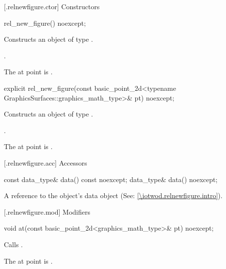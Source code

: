  [\iotwod.relnewfigure.ctor] {Constructors}%

%
\begin{itemdecl}
rel_new_figure() noexcept;
\end{itemdecl}
\begin{itemdescr}
\pnum
\effects Constructs an object of type .

\pnum
\postconditions {}.

\pnum
\remarks The at point is .
\end{itemdescr}

%
\begin{itemdecl}
explicit rel_new_figure(const basic_point_2d<typename
  GraphicsSurfaces::graphics_math_type>& pt) noexcept;
\end{itemdecl}
\begin{itemdescr}
\pnum
\effects Constructs an object of type .

\pnum
\postconditions {}.

\pnum
\remarks The at point is .
\end{itemdescr}

 [\iotwod.relnewfigure.acc] {Accessors}%

%
\begin{itemdecl}
const data_type& data() const noexcept;
data_type& data() noexcept;
\end{itemdecl}
\begin{itemdescr}
\pnum
\returns A reference to the  object's data object (See: \ref{\iotwod.relnewfigure.intro}).
\end{itemdescr}

 [\iotwod.relnewfigure.mod] {Modifiers}%

%
\begin{itemdecl}
void at(const basic_point_2d<graphics_math_type>& pt) noexcept;
\end{itemdecl}
\begin{itemdescr}
\pnum
\effects Calls .

\pnum
\remarks The at point is .
\end{itemdescr}

